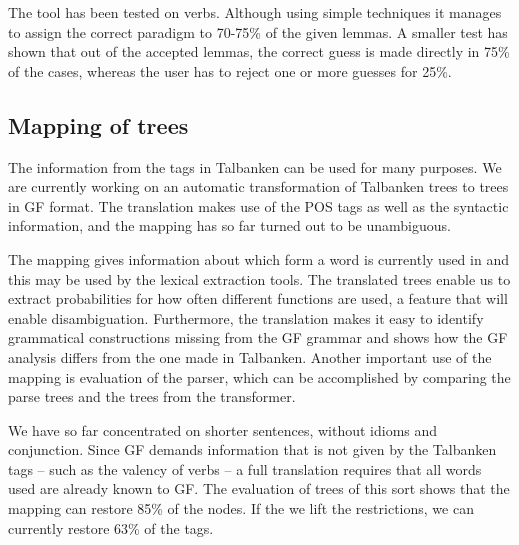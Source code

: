 \documentclass[submission]{eptcs} %
\begin{document}
The tool has been tested on verbs. Although using simple techniques it 
manages to assign the correct paradigm to 70-75\% of the given lemmas.
A smaller test has shown that out of the accepted lemmas, the correct guess is
made directly in 75\% of the cases, whereas the user has to reject one or more
guesses for 25\%. 



\subsection{Mapping of trees}
The information from the tags in Talbanken can be used for many purposes.
We are currently working on an automatic transformation of Talbanken trees 
to trees in GF format. The translation makes use of the POS tags as well as
the syntactic information, and the mapping has so far turned out to be unambiguous. 

The mapping gives information about which form a word is
currently used in and this may be used by the lexical extraction
tools. %
The translated trees enable us to extract probabilities for how often
different functions are used, a feature that will enable disambiguation.
Furthermore, the translation makes it easy to identify grammatical constructions
missing from the GF grammar and shows how the GF analysis differs from the one made
in Talbanken.
Another important use of the mapping is evaluation of the parser, which can be
accomplished by comparing the parse trees and the trees from the transformer.

We have so far concentrated on shorter sentences, without idioms and
conjunction. 
Since GF demands information 
that is not given by the Talbanken tags -- such as the valency of verbs -- a
full translation requires that all words used are already known to GF. 
The evaluation of trees of this sort shows that the mapping
can restore 85\% of the nodes. 
If the we lift the restrictions, we can currently restore 63\% of the tags.
\end{document}
